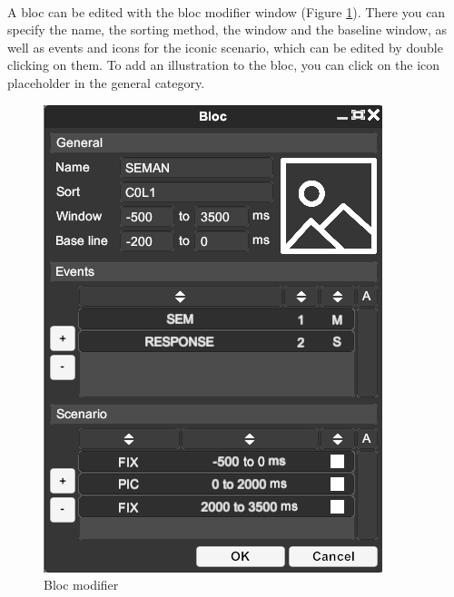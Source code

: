 \documentclass[a4paper]{article}
\begin{document}
\paragraph{} A bloc can be edited with the bloc modifier window (Figure \ref{blocModifierUI}). There you can specify the name, the sorting method, the window and the baseline window, as well as events and icons for the iconic scenario, which can be edited by double clicking on them. To add an illustration to the bloc, you can click on the icon placeholder in the general category.
\begin{figure}[H]
\begin{center}
\includegraphics[scale=0.5]{BlocModifier.png}
\end{center}
\caption{\label{blocModifierUI}Bloc modifier}
\end{figure}
\end{document}
